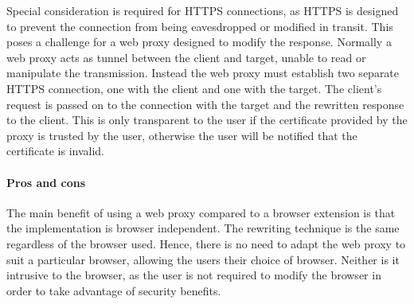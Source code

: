 \documentclass{llncs}
\newcommand{\todo}[1]{\colorbox{red}{\textcolor{white}{\sffamily\bfseries\scriptsize TODO}} \textcolor{red}{#1} \textcolor{red}{$\blacktriangleleft$}}
\begin{document}
Special consideration is required for HTTPS connections, as
%
HTTPS is designed to prevent the connection from being eavesdropped or modified in transit.
%
This poses a challenge for a web proxy designed %
to modify the response. 
Normally a web proxy acts as tunnel between the client and target, unable 
to read or manipulate the transmission. Instead the web proxy must establish 
two separate HTTPS connection, one with the client and one with the target. 
The client's request is passed on to the connection with the target
and the rewritten response to the client. This is only transparent 
to the user if the certificate provided by the proxy is trusted by the user, 
otherwise the user will be notified that the certificate is invalid.



\paragraph{Pros and cons}
The main benefit of using a web proxy 
compared to a browser extension is that the implementation is browser independent. The 
rewriting technique is the same regardless of the browser used. Hence, there is no 
need to adapt the web proxy to suit a particular browser, allowing 
the users their choice of browser.
Neither is it intrusive to the browser, as the user is not required to modify the 
browser in order to take advantage of security benefits. 
\end{document}
